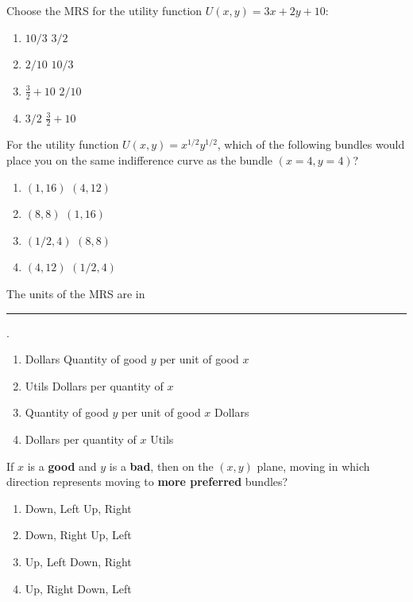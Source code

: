 \begin{question}[type=exam]{3}
  Choose the MRS for the utility function $U(x,y) = 3x + 2y + 10$:
  \begin{enumerate}[label=\alph*), noitemsep]
    \item \vary
      {$10/3$}
      {$3/2$} %
    \item \vary
      {$2/10$}
      {$10/3$}
    \item \vary
      {$\frac{3}{2} + 10$}
      {$2/10$}
    \item \vary
      {$3/2$} %
      {$\frac{3}{2} + 10$}
  \end{enumerate}
\end{question}

\begin{question}[type=exam]{3}
  For the utility function $U(x,y) = x^{1/2}y^{1/2}$, 
  which of the following bundles would place you on the same indifference curve as the bundle $(x=4,y=4)$?
  \begin{enumerate}[label=\alph*), noitemsep]
    \item \vary
    {$(1,16)$} %
    {$(4,12)$}
    \item \vary
    {$(8,8)$}
    {$(1,16)$} %
    \item \vary
    {$(1/2,4)$}
    {$(8,8)$}
    \item \vary
    {$(4,12)$}
    {$(1/2,4)$}
  \end{enumerate}
\end{question}

\begin{question}[type=exam]{3}
  The units of the MRS are in \rule{1cm}{0.15mm}.
  \begin{enumerate}[label=\alph*), noitemsep]
    \item \vary
      {Dollars}
      {Quantity of good $y$ per unit of good $x$} %
    \item \vary
      {Utils}
      {Dollars per quantity of $x$}
    \item \vary
      {Quantity of good $y$ per unit of good $x$} %
      {Dollars}
    \item \vary
      {Dollars per quantity of $x$}
      {Utils}
  \end{enumerate}
\end{question}

\begin{question}[type=exam]{3}
  If $x$ is a \textbf{good} and $y$ is a \textbf{bad}, then on the $(x,y)$ plane, moving in which direction represents moving to \textbf{more preferred} bundles?
  \begin{enumerate}[label=\alph*), noitemsep]
    \item \vary
      {Down, Left}
      {Up, Right}
    \item \vary
      {Down, Right} %
      {Up, Left}
    \item \vary
      {Up, Left}
      {Down, Right} %
    \item \vary
      {Up, Right}
      {Down, Left}
  \end{enumerate}
\end{question}


